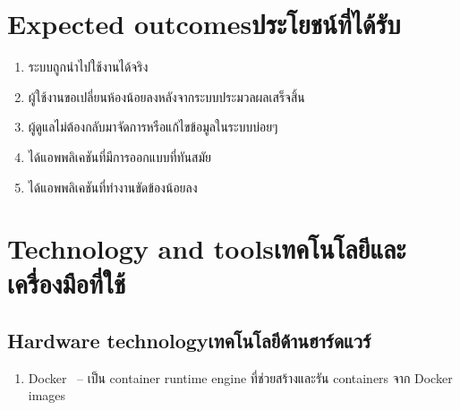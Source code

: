 \section{\ifenglish Expected outcomes\else ประโยชน์ที่ได้รับ\fi}
\begin{enumerate}
    \item ระบบถูกนำไปใช้งานได้จริง
    \item ผู้ใช้งานขอเปลี่ยนห้องน้อยลงหลังจากระบบประมวลผลเสร็จสิ้น
    \item ผู้ดูแลไม่ต้องกลับมาจัดการหรือแก้ไขข้อมูลในระบบบ่อยๆ
    \item ได้แอพพลิเคชันที่มีการออกแบบที่ทันสมัย
    \item ได้แอพพลิเคชันที่ทำงานขัดข้องน้อยลง
\end{enumerate}

\section{\ifenglish Technology and tools\else เทคโนโลยีและเครื่องมือที่ใช้\fi}

\subsection{\ifenglish Hardware technology\else เทคโนโลยีด้านฮาร์ดแวร์\fi}
\begin{enumerate}
    \item Docker~\cite{dke} -- เป็น container runtime engine ที่ช่วยสร้างและรัน containers จาก Docker images
\end{enumerate}

